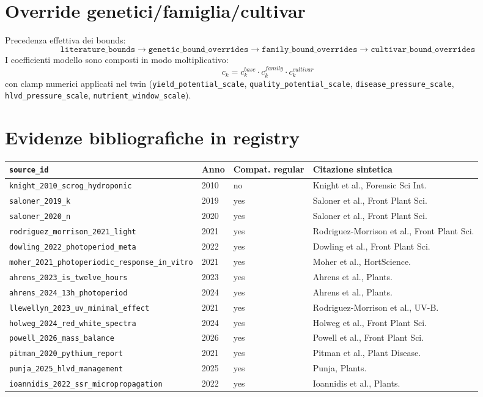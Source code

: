 ﻿\documentclass[11pt,a4paper]{report}
\begin{document}
\section{Override genetici/famiglia/cultivar}
Precedenza effettiva dei bounds:
\[
\texttt{literature\_bounds} \rightarrow \texttt{genetic\_bound\_overrides} \rightarrow \texttt{family\_bound\_overrides} \rightarrow \texttt{cultivar\_bound\_overrides}
\]
I coefficienti modello sono composti in modo moltiplicativo:
\[
c_k = c^{base}_k \cdot c^{family}_k \cdot c^{cultivar}_k
\]
con clamp numerici applicati nel twin (\texttt{yield\_potential\_scale}, \texttt{quality\_potential\_scale}, \texttt{disease\_pressure\_scale}, \texttt{hlvd\_pressure\_scale}, \texttt{nutrient\_window\_scale}).

\section{Evidenze bibliografiche in registry}
\begin{longtable}{@{}p{3.7cm}p{0.9cm}p{2.3cm}p{7.0cm}@{}}
\toprule
\texttt{source\_id} & Anno & Compat. regular & Citazione sintetica \\ \midrule
\texttt{knight\_2010\_scrog\_hydroponic} & 2010 & no & Knight et al., Forensic Sci Int. \\
\texttt{saloner\_2019\_k} & 2019 & yes & Saloner et al., Front Plant Sci. \\
\texttt{saloner\_2020\_n} & 2020 & yes & Saloner et al., Front Plant Sci. \\
\texttt{rodriguez\_morrison\_2021\_light} & 2021 & yes & Rodriguez-Morrison et al., Front Plant Sci. \\
\texttt{dowling\_2022\_photoperiod\_meta} & 2022 & yes & Dowling et al., Front Plant Sci. \\
\texttt{moher\_2021\_photoperiodic\_response\_in\_vitro} & 2021 & yes & Moher et al., HortScience. \\
\texttt{ahrens\_2023\_is\_twelve\_hours} & 2023 & yes & Ahrens et al., Plants. \\
\texttt{ahrens\_2024\_13h\_photoperiod} & 2024 & yes & Ahrens et al., Plants. \\
\texttt{llewellyn\_2023\_uv\_minimal\_effect} & 2021 & yes & Rodriguez-Morrison et al., UV-B. \\
\texttt{holweg\_2024\_red\_white\_spectra} & 2024 & yes & Holweg et al., Front Plant Sci. \\
\texttt{powell\_2026\_mass\_balance} & 2026 & yes & Powell et al., Front Plant Sci. \\
\texttt{pitman\_2020\_pythium\_report} & 2021 & yes & Pitman et al., Plant Disease. \\
\texttt{punja\_2025\_hlvd\_management} & 2025 & yes & Punja, Plants. \\
\texttt{ioannidis\_2022\_ssr\_micropropagation} & 2022 & yes & Ioannidis et al., Plants. \\
\bottomrule
\end{longtable}
\end{document}
